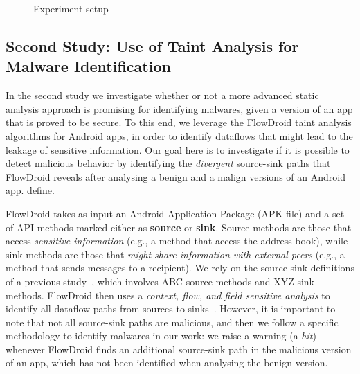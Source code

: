 \begin{figure}[ht]
   \label{Experiment setup}
   \caption{Experiment setup}
   \label{fig:setup}
 \end{figure}

\subsection{Second Study: Use of Taint Analysis for Malware Identification}\label{sec:set2}

In the second study 
we investigate whether or not a more advanced static analysis approach is promising for
identifying malwares, given a version of an app that is proved to be secure.
To this end, we leverage the FlowDroid
taint analysis algorithms for Android apps, in order to identify dataflows
that might lead to the leakage of sensitive information. Our
goal here is to investigate if it is possible to detect malicious
behavior by identifying the \emph{divergent} source-sink paths that FlowDroid reveals after
analysing a benign and a malign versions of an Android app.
define.

FlowDroid takes as input an Android Application Package (APK file) and
a set of API methods marked either as {\bf source}
or {\bf sink}. Source methods are those that access \emph{sensitive information} (e.g.,
a method that access the address book), while sink methods are those 
that \emph{might share information with external peers} (e.g., a method that
sends messages to a recipient). We rely on the source-sink definitions of a previous
study~\cite{}, which involves ABC source methods and XYZ sink methods.
FlowDroid then uses a \emph{context, flow, and field
sensitive analysis} to identify all dataflow paths from sources to sinks~\cite{}.
However, it is important to note that not all source-sink paths are malicious, and then we
follow a specific methodology to identify malwares in our work: we raise a
warning (a \emph{hit}) whenever
FlowDroid finds an additional source-sink path in the malicious version of an app, which
has not been identified when analysing the benign version.

